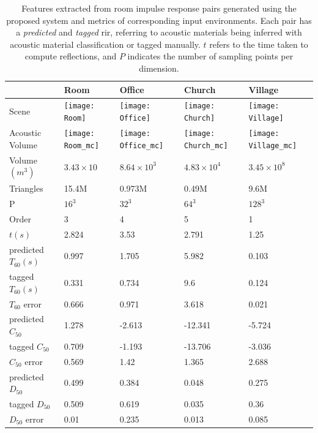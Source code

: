 \begin{table}
  \caption{Features extracted from room impulse response pairs generated using the proposed system and metrics of corresponding input environments. Each pair has a \emph{predicted} and \emph{tagged} \acrshort{rir}, referring to acoustic materials being inferred with acoustic material classification or tagged manually. $t$ refers to the time taken to compute reflections, and $P$ indicates the number of sampling points per dimension.}
  \label{tab:ism_scene_scores}
	\centering%
\begin{tabular}{lllll}
                         & Room             & Office            & Church         & Village        \\ \midrule
Scene                    & \texttt{[image: Room]}  & \texttt{[image: Office]} & \texttt{[image: Church]} & \texttt{[image: Village]} \\
Acoustic Volume          & \texttt{[image: Room\_mc]}  & \texttt{[image: Office\_mc]} & \texttt{[image: Church\_mc]} & \texttt{[image: Village\_mc]} \\ \midrule
Volume $(m^3)$           & $3.43 \times 10$      & $8.64 \times 10^3$     & $4.83 \times 10^4$  & $3.45 \times 10^8$  \\
Triangles                & 15.4M            & 0.973M            & 0.49M          & 9.6M           \\
P                        & $16^3$           & $32^3$            & $64^3$         & $128^3$        \\
Order                    & 3                & 4                 & 5              & 1              \\
$t (s) $                 & 2.824            & 3.53              & 2.791          & 1.25           \\ \midrule
predicted $T_{60} (s)$   & 0.997            & 1.705             & 5.982          & 0.103          \\
tagged $T_{60}(s)$       & 0.331            & 0.734             & 9.6            & 0.124          \\
$T_{60}$ error           & 0.666            & 0.971             & 3.618          & 0.021          \\ \midrule
predicted $C_{50}$       & 1.278            & -2.613            & -12.341        & -5.724         \\
tagged $C_{50}$          & 0.709            & -1.193            & -13.706        & -3.036         \\
$C_{50}$ error           & 0.569            & 1.42              & 1.365          & 2.688          \\ \midrule
predicted $D_{50}$       & 0.499            & 0.384             & 0.048          & 0.275          \\
tagged $D_{50}$          & 0.509            & 0.619             & 0.035          & 0.36          \\
$D_{50}$ error           & 0.01             & 0.235             & 0.013           & 0.085          \\
\end{tabular}%
\end{table}

